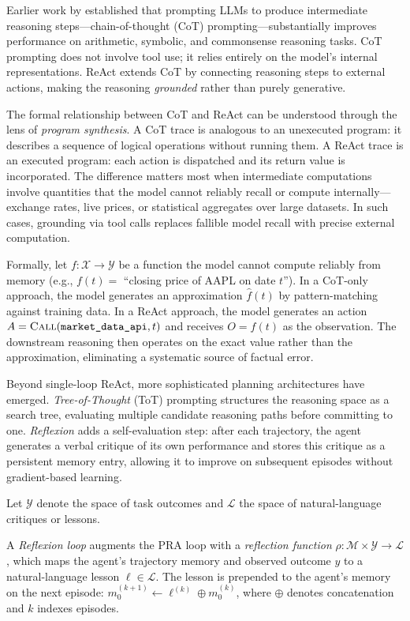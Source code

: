 \begin{deepdive}
Earlier work by \citet{wei2022chain} established that prompting LLMs to produce
intermediate reasoning steps---chain-of-thought (CoT) prompting---substantially
improves performance on arithmetic, symbolic, and commonsense reasoning tasks. CoT
prompting does not involve tool use; it relies entirely on the model's internal
representations. ReAct extends CoT by connecting reasoning steps to external actions,
making the reasoning \emph{grounded} rather than purely generative.

The formal relationship between CoT and ReAct can be understood through the lens
of \emph{program synthesis}. A CoT trace is analogous to an unexecuted program: it
describes a sequence of logical operations without running them. A ReAct trace is an
executed program: each action is dispatched and its return value is incorporated. The
difference matters most when intermediate computations involve quantities that the
model cannot reliably recall or compute internally---exchange rates, live prices, or
statistical aggregates over large datasets. In such cases, grounding via tool calls
replaces fallible model recall with precise external computation.

Formally, let $f: \mathcal{X} \to \mathcal{Y}$ be a function the model cannot compute
reliably from memory (e.g., $f(t) = $ ``closing price of AAPL on date $t$''). In a
CoT-only approach, the model generates an approximation $\hat{f}(t)$ by pattern-matching
against training data. In a ReAct approach, the model generates an action
$A = \textsc{Call}(\texttt{market\_data\_api}, t)$ and receives $O = f(t)$ as the
observation. The downstream reasoning then operates on the exact value rather than the
approximation, eliminating a systematic source of factual error.

Beyond single-loop ReAct, more sophisticated planning architectures have emerged.
\emph{Tree-of-Thought} (ToT) prompting \cite{yao2023tree} structures the reasoning
space as a search tree, evaluating multiple candidate reasoning paths before committing
to one. \emph{Reflexion} \cite{shinn2023reflexion} adds a self-evaluation step: after
each trajectory, the agent generates a verbal critique of its own performance and stores
this critique as a persistent memory entry, allowing it to improve on subsequent
episodes without gradient-based learning.

Let $\mathcal{Y}$ denote the space of task outcomes and $\mathcal{L}$ the space of natural-language critiques or lessons.

\begin{definition}
\label{def:reflexion-loop}
A \emph{Reflexion loop} augments the PRA loop with a \emph{reflection function}
$\rho: \mathcal{M} \times \mathcal{Y} \to \mathcal{L}$, which maps the agent's
trajectory memory and observed outcome $y$ to a natural-language lesson $\ell \in
\mathcal{L}$. The lesson is prepended to the agent's memory on the next episode:
$m_0^{(k+1)} \gets \ell^{(k)} \oplus m_0^{(k)}$, where $\oplus$ denotes concatenation
and $k$ indexes episodes.
\end{definition}


\end{deepdive}

